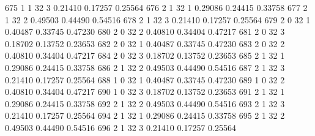\documentclass{article}
\begin{document}
\begin{Woutput}
 675      1       1      32       3       0.21410    0.17257    0.25564
 676      2       1      32       1       0.29086    0.24415    0.33758
 677      2       1      32       2       0.49503    0.44490    0.54516
 678      2       1      32       3       0.21410    0.17257    0.25564
 679      2       0      32       1       0.40487    0.33745    0.47230
 680      2       0      32       2       0.40810    0.34404    0.47217
 681      2       0      32       3       0.18702    0.13752    0.23653
 682      2       0      32       1       0.40487    0.33745    0.47230
 683      2       0      32       2       0.40810    0.34404    0.47217
 684      2       0      32       3       0.18702    0.13752    0.23653
 685      2       1      32       1       0.29086    0.24415    0.33758
 686      2       1      32       2       0.49503    0.44490    0.54516
 687      2       1      32       3       0.21410    0.17257    0.25564
 688      1       0      32       1       0.40487    0.33745    0.47230
 689      1       0      32       2       0.40810    0.34404    0.47217
 690      1       0      32       3       0.18702    0.13752    0.23653
 691      2       1      32       1       0.29086    0.24415    0.33758
 692      2       1      32       2       0.49503    0.44490    0.54516
 693      2       1      32       3       0.21410    0.17257    0.25564
 694      2       1      32       1       0.29086    0.24415    0.33758
 695      2       1      32       2       0.49503    0.44490    0.54516
 696      2       1      32       3       0.21410    0.17257    0.25564


\end{Woutput}
\end{document}
